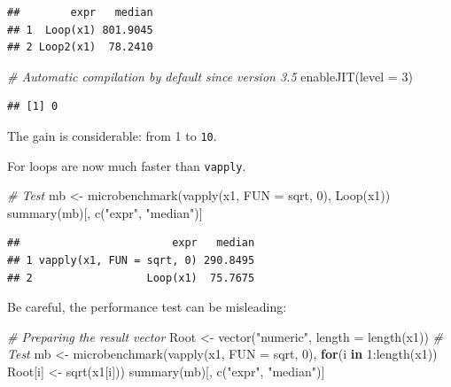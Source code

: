 \documentclass[
  12pt,
  american,
  a4paper,
  extrafontsizes,onecolumn,openright
  ]{memoir}
\newenvironment{Shaded}{\begin{snugshade}}{\end{snugshade}}
\newcommand{\AttributeTok}[1]{\textcolor[rgb]{0.77,0.63,0.00}{#1}}
\newcommand{\CommentTok}[1]{\textcolor[rgb]{0.56,0.35,0.01}{\textit{#1}}}
\newcommand{\ControlFlowTok}[1]{\textcolor[rgb]{0.13,0.29,0.53}{\textbf{#1}}}
\newcommand{\DecValTok}[1]{\textcolor[rgb]{0.00,0.00,0.81}{#1}}
\newcommand{\FunctionTok}[1]{\textcolor[rgb]{0.00,0.00,0.00}{#1}}
\newcommand{\NormalTok}[1]{#1}
\newcommand{\OtherTok}[1]{\textcolor[rgb]{0.56,0.35,0.01}{#1}}
\newcommand{\SpecialCharTok}[1]{\textcolor[rgb]{0.00,0.00,0.00}{#1}}
\newcommand{\StringTok}[1]{\textcolor[rgb]{0.31,0.60,0.02}{#1}}
\newlength{\rf}
\begin{document}
\begin{verbatim}
##        expr   median
## 1  Loop(x1) 801.9045
## 2 Loop2(x1)  78.2410
\end{verbatim}

\begin{Shaded}
\begin{Highlighting}[]
\CommentTok{\# Automatic compilation by default since version 3.5}
\FunctionTok{enableJIT}\NormalTok{(}\AttributeTok{level =} \DecValTok{3}\NormalTok{)}
\end{Highlighting}
\end{Shaded}

\begin{verbatim}
## [1] 0
\end{verbatim}

\normalsize

The gain is considerable: from 1 to \texttt{10}.

For loops are now much faster than \texttt{vapply}.

\scriptsize

\begin{Shaded}
\begin{Highlighting}[]
\CommentTok{\# Test}
\NormalTok{mb }\OtherTok{\textless{}{-}} \FunctionTok{microbenchmark}\NormalTok{(}\FunctionTok{vapply}\NormalTok{(x1, }\AttributeTok{FUN =}\NormalTok{ sqrt, }\DecValTok{0}\NormalTok{), }\FunctionTok{Loop}\NormalTok{(x1))}
\FunctionTok{summary}\NormalTok{(mb)[, }\FunctionTok{c}\NormalTok{(}\StringTok{"expr"}\NormalTok{, }\StringTok{"median"}\NormalTok{)]}
\end{Highlighting}
\end{Shaded}

\begin{verbatim}
##                        expr   median
## 1 vapply(x1, FUN = sqrt, 0) 290.8495
## 2                  Loop(x1)  75.7675
\end{verbatim}

\normalsize

Be careful, the performance test can be misleading:

\scriptsize

\begin{Shaded}
\begin{Highlighting}[]
\CommentTok{\# Preparing the result vector}
\NormalTok{Root }\OtherTok{\textless{}{-}} \FunctionTok{vector}\NormalTok{(}\StringTok{"numeric"}\NormalTok{, }\AttributeTok{length =} \FunctionTok{length}\NormalTok{(x1))}
\CommentTok{\# Test}
\NormalTok{mb }\OtherTok{\textless{}{-}} \FunctionTok{microbenchmark}\NormalTok{(}\FunctionTok{vapply}\NormalTok{(x1, }\AttributeTok{FUN =}\NormalTok{ sqrt, }\DecValTok{0}\NormalTok{), }
                     \ControlFlowTok{for}\NormalTok{(i }\ControlFlowTok{in} \DecValTok{1}\SpecialCharTok{:}\FunctionTok{length}\NormalTok{(x1)) }
\NormalTok{                       Root[i] }\OtherTok{\textless{}{-}} \FunctionTok{sqrt}\NormalTok{(x1[i]))}
\FunctionTok{summary}\NormalTok{(mb)[, }\FunctionTok{c}\NormalTok{(}\StringTok{"expr"}\NormalTok{, }\StringTok{"median"}\NormalTok{)]}
\end{Highlighting}
\end{Shaded}
\end{document}
